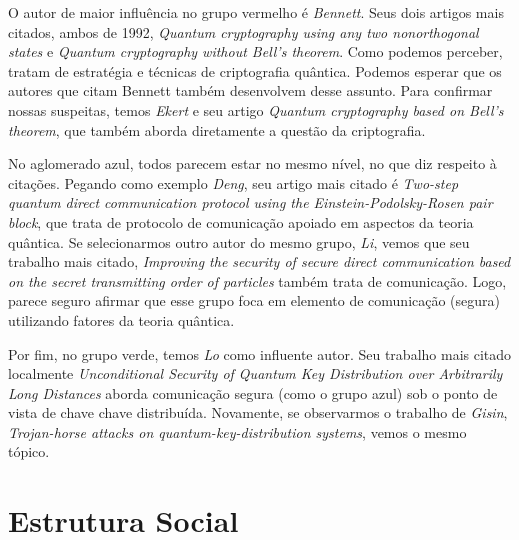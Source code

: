 O autor de maior influência no grupo vermelho é \textit{Bennett}. Seus dois artigos mais citados, ambos de 1992, \textit{Quantum cryptography using any two nonorthogonal states} e \textit{Quantum cryptography without Bell’s theorem}. Como podemos perceber, tratam de estratégia e técnicas de criptografia quântica. Podemos esperar que os autores que citam Bennett também desenvolvem desse assunto. Para confirmar nossas suspeitas, temos \textit{Ekert} e seu artigo \textit{Quantum cryptography based on Bell’s theorem}, que também aborda diretamente a questão da criptografia.

No aglomerado azul, todos parecem estar no mesmo nível, no que diz respeito à citações. Pegando como exemplo \textit{Deng}, seu artigo mais citado é \textit{Two-step quantum direct communication protocol using the Einstein-Podolsky-Rosen pair block}, que trata de protocolo de comunicação apoiado em aspectos da teoria quântica. Se selecionarmos outro autor do mesmo grupo, \textit{Li}, vemos que seu trabalho mais citado, \textit{Improving the security of secure direct communication based on the secret transmitting order of particles} também trata de comunicação. Logo, parece seguro afirmar que esse grupo foca em elemento de comunicação (segura) utilizando fatores da teoria quântica.

Por fim, no grupo verde, temos \textit{Lo} como influente autor. Seu trabalho mais citado localmente \textit{Unconditional Security of Quantum Key Distribution over Arbitrarily Long Distances} aborda comunicação segura (como o grupo azul) sob o ponto de vista de chave chave distribuída. Novamente, se observarmos o trabalho de \textit{Gisin}, \textit{Trojan-horse attacks on quantum-key-distribution systems}, vemos o mesmo tópico.


\section{Estrutura Social}

